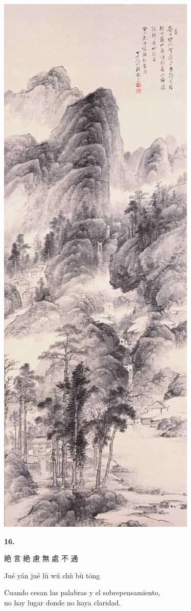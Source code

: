 \documentclass[
  a5paperpaper,
]{article}
\begin{document}
\hypertarget{01}{}
\includegraphics{../img/image04.jpg}

\begin{verseblock}

\newpage

\begin{center}\textbf{16.}\end{center}

絶 言 絶 慮 無 處 不 通

Jué yán jué lù wú chù bù tōng

Cuando cesan las palabras y el sobrepensamiento,\\
no hay lugar donde no haya claridad.

\end{verseblock}
\end{document}
